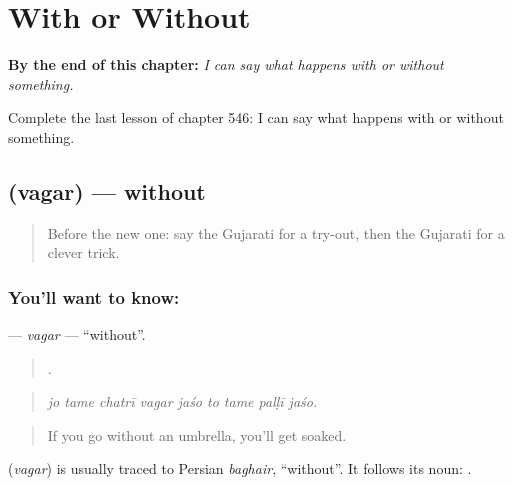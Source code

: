 
\chapter{With or Without}
\label{ch:gu-with-or-without}

\begin{chapteropening}
\textbf{By the end of this chapter:} \emph{I can say what happens with or without something.}

Complete the last lesson of chapter 546: I can say what happens with or without something.
\end{chapteropening}

\section[\texorpdfstring{\gu{વગર} (vagar)}{વગર (vagar)}]{ (vagar) — without}

\label{lesson:GU-C546-vagar}



\begin{quote}
Before the new one: say the Gujarati for a try-out, then the Gujarati for a clever trick.
\end{quote}

\subsection*{You'll want to know: }
\textbf{} — \emph{vagar} — \textquotedblleft{}without\textquotedblright{}.

\begin{quote}
        .
\end{quote}

\begin{quote}
\emph{jo tame chatrī vagar jaśo to tame palḷī jaśo.}
\end{quote}

\begin{quote}
If you go without an umbrella, you'll get soaked.
\end{quote}

\begin{cousinweb}
\textbf{} (\emph{vagar}) is usually traced to Persian \emph{baghair}, \textquotedblleft{}without\textquotedblright{}. It follows its noun: \textbf{ }.
\end{cousinweb}

